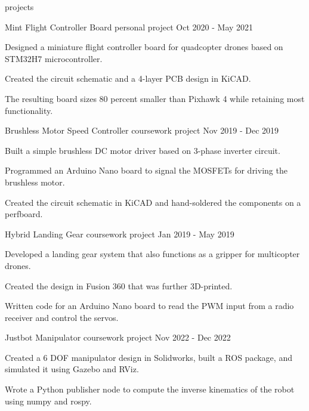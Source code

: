\begin{section}{projects}
  
  \begin{project}
    {Mint Flight Controller Board}
    {personal project}
    {Oct 2020 - May 2021}

    \item Designed a miniature flight controller board for quadcopter drones based on STM32H7 microcontroller.
    \item Created the circuit schematic and a 4-layer PCB design in KiCAD.
    \item The resulting board sizes 80 percent smaller than Pixhawk 4 while retaining most functionality.
  
  \end{project}

  \begin{project}
    {Brushless Motor Speed Controller}
    {coursework project}
    {Nov 2019 - Dec 2019}

    \item Built a simple brushless DC motor driver based on 3-phase inverter circuit.
    \item Programmed an Arduino Nano board to signal the MOSFETs for driving the brushless motor.
    \item Created the circuit schematic in KiCAD and hand-soldered the components on a perfboard.
  
  \end{project}

  \begin{project}
    {Hybrid Landing Gear}
    {coursework project}
    {Jan 2019 - May 2019}

    \item Developed a landing gear system that also functions as a gripper for multicopter drones.
    \item Created the design in Fusion 360 that was further 3D-printed.
    \item Written code for an Arduino Nano board to read the PWM input from a radio receiver and control the servos.
  
  \end{project}

  \begin{project}
    {Justbot Manipulator}
    {coursework project}
    {Nov 2022 - Dec 2022}

    \item Created a 6 DOF manipulator design in Solidworks, built a ROS package, and simulated it using Gazebo and RViz.
    \item Wrote a Python publisher node to compute the inverse kinematics of the robot using numpy and rospy.
  
  \end{project}

\end{section}